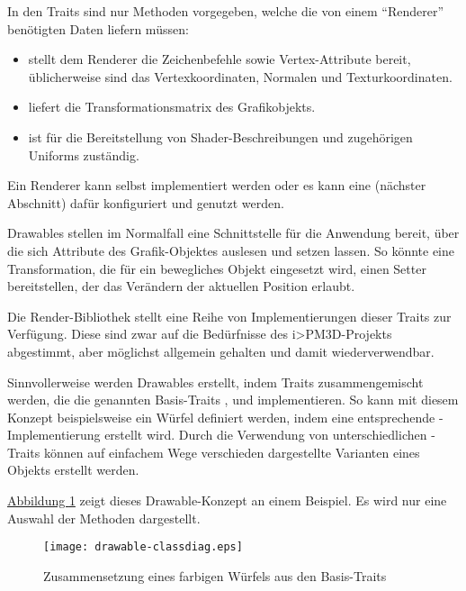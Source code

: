 \documentclass[a4paper,10pt]{sphinxmanual}
\begin{document}
In den Traits sind nur Methoden vorgegeben, welche die von einem "`Renderer"' benötigten Daten liefern müssen:
\begin{itemize}
\item {} 
 stellt dem Renderer die Zeichenbefehle sowie Vertex-Attribute bereit, üblicherweise sind das Vertexkoordinaten, Normalen und Texturkoordinaten.

\item {} 
 liefert die Transformationsmatrix des Grafikobjekts.

\item {} 
 ist für die Bereitstellung von Shader-Beschreibungen und zugehörigen Uniforms zuständig.

\end{itemize}

Ein Renderer kann selbst implementiert werden oder es kann eine  (nächster Abschnitt) dafür konfiguriert und genutzt werden.

Drawables stellen im Normalfall eine Schnittstelle für die Anwendung bereit, über die sich Attribute des Grafik-Objektes auslesen und setzen lassen.
So könnte eine Transformation, die für ein bewegliches Objekt eingesetzt wird, einen Setter bereitstellen, der das Verändern der aktuellen Position erlaubt.

Die Render-Bibliothek stellt eine Reihe von Implementierungen dieser Traits zur Verfügung.
Diese sind zwar auf die Bedürfnisse des i\textgreater{}PM3D-Projekts abgestimmt, aber möglichst allgemein gehalten und damit wiederverwendbar.

Sinnvollerweise werden Drawables erstellt, indem Traits zusammengemischt werden, die die genannten Basis-Traits ,  und  implementieren.
So kann mit diesem Konzept beispielsweise ein Würfel definiert werden, indem eine entsprechende -Implementierung erstellt wird.
Durch die Verwendung von unterschiedlichen -Traits können auf einfachem Wege verschieden dargestellte Varianten eines Objekts erstellt werden.

\hyperref[renderbib:drawable-classdiag]{Abbildung  \ref*{renderbib:drawable-classdiag}} zeigt dieses Drawable-Konzept an einem Beispiel. Es wird nur eine Auswahl der Methoden dargestellt.
\begin{figure}[htbp]
\centering
\capstart

\texttt{[image: drawable-classdiag.eps]}
\caption{Zusammensetzung eines farbigen Würfels aus den Basis-Traits}\label{renderbib:drawable-classdiag}\end{figure}
\end{document}
